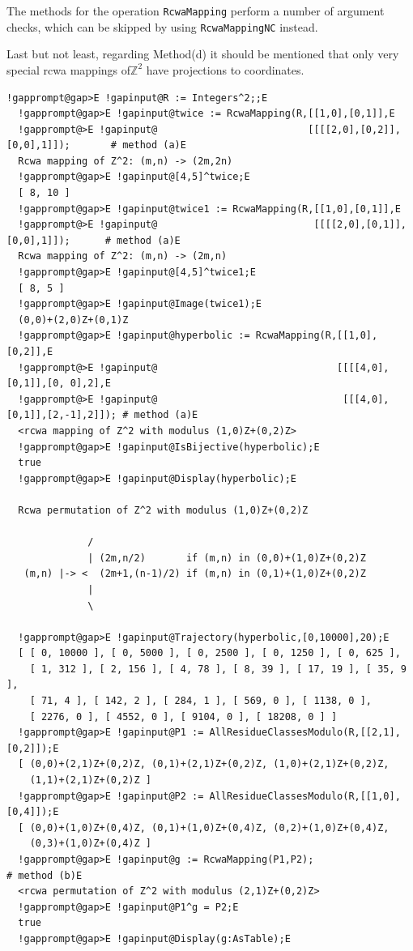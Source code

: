 \documentclass[a4paper,11pt]{report}
\begin{document}
{{{ The methods for the operation \texttt{RcwaMapping} perform a number of argument checks, which can be skipped by using \texttt{RcwaMappingNC} instead. 

 Last but not least, regarding Method{\nobreakspace}(d) it should be mentioned
that only very special rcwa mappings of{\nobreakspace}${\ensuremath{\mathbb Z}}^2$ have projections to coordinates. 
\begin{Verbatim}[commandchars=!@E,fontsize=\small,frame=single,label=Example]
  !gapprompt@gap>E !gapinput@R := Integers^2;;E
  !gapprompt@gap>E !gapinput@twice := RcwaMapping(R,[[1,0],[0,1]],E
  !gapprompt@>E !gapinput@                          [[[[2,0],[0,2]],[0,0],1]]);       # method (a)E
  Rcwa mapping of Z^2: (m,n) -> (2m,2n)
  !gapprompt@gap>E !gapinput@[4,5]^twice;E
  [ 8, 10 ]
  !gapprompt@gap>E !gapinput@twice1 := RcwaMapping(R,[[1,0],[0,1]],E
  !gapprompt@>E !gapinput@                           [[[[2,0],[0,1]],[0,0],1]]);      # method (a)E
  Rcwa mapping of Z^2: (m,n) -> (2m,n)
  !gapprompt@gap>E !gapinput@[4,5]^twice1;E
  [ 8, 5 ]
  !gapprompt@gap>E !gapinput@Image(twice1);E
  (0,0)+(2,0)Z+(0,1)Z
  !gapprompt@gap>E !gapinput@hyperbolic := RcwaMapping(R,[[1,0],[0,2]],E
  !gapprompt@>E !gapinput@                               [[[[4,0],[0,1]],[0, 0],2],E
  !gapprompt@>E !gapinput@                                [[[4,0],[0,1]],[2,-1],2]]); # method (a)E
  <rcwa mapping of Z^2 with modulus (1,0)Z+(0,2)Z>
  !gapprompt@gap>E !gapinput@IsBijective(hyperbolic);E
  true
  !gapprompt@gap>E !gapinput@Display(hyperbolic);E
  
  Rcwa permutation of Z^2 with modulus (1,0)Z+(0,2)Z
  
              /
              | (2m,n/2)       if (m,n) in (0,0)+(1,0)Z+(0,2)Z
   (m,n) |-> <  (2m+1,(n-1)/2) if (m,n) in (0,1)+(1,0)Z+(0,2)Z
              |
              \
  
  !gapprompt@gap>E !gapinput@Trajectory(hyperbolic,[0,10000],20);E
  [ [ 0, 10000 ], [ 0, 5000 ], [ 0, 2500 ], [ 0, 1250 ], [ 0, 625 ], 
    [ 1, 312 ], [ 2, 156 ], [ 4, 78 ], [ 8, 39 ], [ 17, 19 ], [ 35, 9 ], 
    [ 71, 4 ], [ 142, 2 ], [ 284, 1 ], [ 569, 0 ], [ 1138, 0 ], 
    [ 2276, 0 ], [ 4552, 0 ], [ 9104, 0 ], [ 18208, 0 ] ]
  !gapprompt@gap>E !gapinput@P1 := AllResidueClassesModulo(R,[[2,1],[0,2]]);E
  [ (0,0)+(2,1)Z+(0,2)Z, (0,1)+(2,1)Z+(0,2)Z, (1,0)+(2,1)Z+(0,2)Z,
    (1,1)+(2,1)Z+(0,2)Z ]
  !gapprompt@gap>E !gapinput@P2 := AllResidueClassesModulo(R,[[1,0],[0,4]]);E
  [ (0,0)+(1,0)Z+(0,4)Z, (0,1)+(1,0)Z+(0,4)Z, (0,2)+(1,0)Z+(0,4)Z,
    (0,3)+(1,0)Z+(0,4)Z ]
  !gapprompt@gap>E !gapinput@g := RcwaMapping(P1,P2);                                 # method (b)E
  <rcwa permutation of Z^2 with modulus (2,1)Z+(0,2)Z>
  !gapprompt@gap>E !gapinput@P1^g = P2;E
  true
  !gapprompt@gap>E !gapinput@Display(g:AsTable);E
  

\end{Verbatim}}}}
\end{document}

